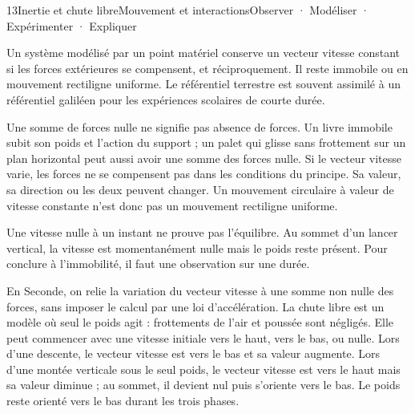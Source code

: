 \begin{ouverture}[mouvement]{13}{Inertie et chute libre}{Mouvement et interactions}{Observer · Modéliser · Expérimenter · Expliquer}
\end{ouverture}
\essentiel
{}
\begin{loi}Un système modélisé par un point matériel conserve un vecteur vitesse constant si les forces extérieures se compensent, et réciproquement. Il reste immobile ou en mouvement rectiligne uniforme. Le référentiel terrestre est souvent assimilé à un référentiel galiléen pour les expériences scolaires de courte durée.\end{loi}
Une somme de forces nulle ne signifie pas absence de forces. Un livre immobile subit son poids et l'action du support ; un palet qui glisse sans frottement sur un plan horizontal peut aussi avoir une somme des forces nulle.
Si le vecteur vitesse varie, les forces ne se compensent pas dans les conditions du principe. Sa valeur, sa direction ou les deux peuvent changer. Un mouvement circulaire à valeur de vitesse constante n'est donc pas un mouvement rectiligne uniforme.
\begin{attention}Une vitesse nulle à un instant ne prouve pas l'équilibre. Au sommet d'un lancer vertical, la vitesse est momentanément nulle mais le poids reste présent. Pour conclure à l'immobilité, il faut une observation sur une durée.\end{attention}
En Seconde, on relie la variation du vecteur vitesse à une somme non nulle des forces, sans imposer le calcul par une loi d'accélération.
La chute libre est un modèle où seul le poids agit : frottements de l'air et poussée sont négligés. Elle peut commencer avec une vitesse initiale vers le haut, vers le bas, ou nulle.
Lors d'une descente, le vecteur vitesse est vers le bas et sa valeur augmente. Lors d'une montée verticale sous le seul poids, le vecteur vitesse est vers le haut mais sa valeur diminue ; au sommet, il devient nul puis s'oriente vers le bas. Le poids reste orienté vers le bas durant les trois phases.
